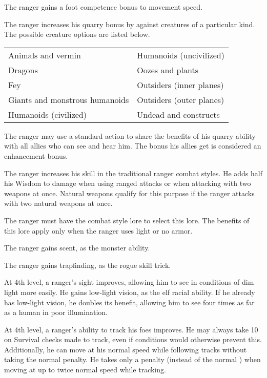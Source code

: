  The ranger gains a  foot competence bonus to movement speed.

 The ranger increases his quarry bonus by  against creatures of a particular kind. The possible creature options are listed below.

\begin{dtable}
\begin{tabularx}{\columnwidth}{X X}
Animals and vermin & Humanoids (uncivilized) \\
Dragons & Oozes and plants \\
Fey & Outsiders (inner planes) \\
Giants and monstrous humanoids & Outsiders (outer planes) \\
Humanoids (civilized)  & Undead and constructs \\
\end{tabularx}
\end{dtable}

 The ranger may use a standard action to share the benefits of his quarry ability with all allies who can see and hear him. The bonus his allies get is considered an enhancement bonus.

 The ranger increases his skill in the traditional ranger combat styles. He adds half his Wisdom to damage when using ranged attacks or when attacking with two weapons at once. Natural weapons qualify for this purpose if the ranger attacks with two natural weapons at once.

The ranger must have the combat style lore to select this lore. The benefits of this lore apply only when the ranger uses light or no armor.

 The ranger gains scent, as the monster ability.

 The ranger gains trapfinding, as the rogue skill trick.

 At 4th level, a ranger's sight improves, allowing him to see in conditions of dim light more easily. He gains low-light vision, as the elf racial ability. If he already has low-light vision, he doubles its benefit, allowing him to see four times as far as a human in poor illumination.

 At 4th level, a ranger's ability to track his foes improves. He may always take 10 on Survival checks made to track, even if conditions would otherwise prevent this. Additionally, he can move at his normal speed while following tracks without taking the normal  penalty. He takes only a  penalty (instead of the normal ) when moving at up to twice normal speed while tracking.

